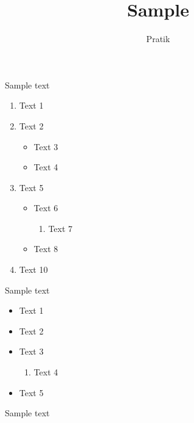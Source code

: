 \documentclass[12pt]{article}
\begin{document}
\title{Sample}
\author{Pratik}\maketitle

Sample text

\begin{enumerate}
\item Text 1
\item Text 2
\begin{itemize}
\item Text 3
\item Text 4
\end{itemize}
\item Text 5
\begin{itemize}
\item Text 6
\begin{enumerate}
\item Text 7
\end{enumerate}
\item Text 8
\end{itemize}
\item Text 10
\end{enumerate}

Sample text

\begin{itemize}
\item Text 1
\item Text 2
\item Text 3
\begin{enumerate}
\item Text 4
\end{enumerate}
\item Text 5
\end{itemize}

Sample text
\end{document}
